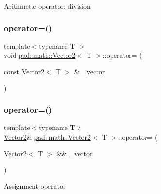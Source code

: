 Arithmetic operator\+: division \mbox{\label{structpad_1_1math_1_1_vector2_aa51f745cce489dd9eac9291a1a9bc5c2}} 
\subsubsection{\texorpdfstring{operator=()}{operator=()}\hspace{0.1cm}{\footnotesize\ttfamily [1/2]}}
{\footnotesize\ttfamily template$<$typename T $>$ \\
void \mbox{\hyperlink{structpad_1_1math_1_1_vector2}{pad\+::math\+::\+Vector2}}$<$ T $>$\+::operator= (\begin{DoxyParamCaption}\item[{const \mbox{\hyperlink{structpad_1_1math_1_1_vector2}{Vector2}}$<$ T $>$ \&}]{\+\_\+vector }\end{DoxyParamCaption})}

\mbox{\label{structpad_1_1math_1_1_vector2_a33461284df3fb3b552f58aa3546da484}} 
\subsubsection{\texorpdfstring{operator=()}{operator=()}\hspace{0.1cm}{\footnotesize\ttfamily [2/2]}}
{\footnotesize\ttfamily template$<$typename T$>$ \\
\mbox{\hyperlink{structpad_1_1math_1_1_vector2}{Vector2}}\& \mbox{\hyperlink{structpad_1_1math_1_1_vector2}{pad\+::math\+::\+Vector2}}$<$ T $>$\+::operator= (\begin{DoxyParamCaption}\item[{\mbox{\hyperlink{structpad_1_1math_1_1_vector2}{Vector2}}$<$ T $>$ \&\&}]{\+\_\+vector }\end{DoxyParamCaption})\hspace{0.3cm}{\ttfamily [default]}}

Assignment operator \mbox{\label{structpad_1_1math_1_1_vector2_a972117e74465bc6e610d646943922975}} 

